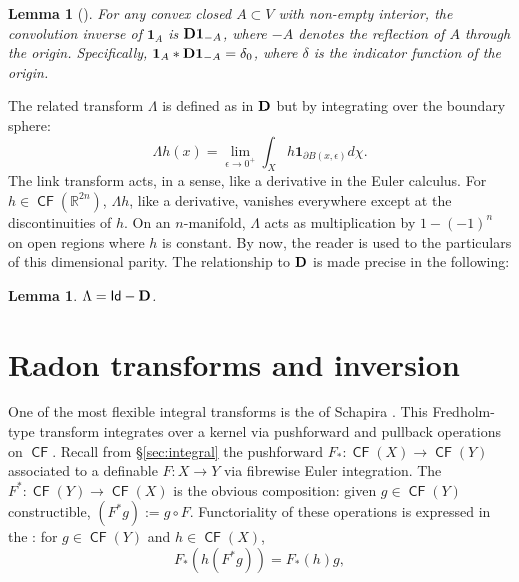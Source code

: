 \documentclass{psapm-l}
\newtheorem{lemma}[theorem]{Lemma}
\theoremstyle{definition}
\theoremstyle{remark}
\numberwithin{equation}{section}
\begin{document}
\begin{lemma}[\cite{Schapira:tom}]
\label{lem:deconv}
For any convex closed $A\subset V$ with non-empty interior, the convolution inverse of ${{\mathbf{1}}}_A$ is ${{\bf D}}{{\mathbf{1}}}_{-A}$, where $-A$ denotes the reflection of $A$ through the origin. Specifically, ${{\mathbf{1}}}_A*{{\bf D}}{{\mathbf{1}}}_{-A}=\delta_0$, where $\delta$ is the indicator function of the origin.
\end{lemma}

The related {{}} transform ${{\Lambda}}$ is defined as in ${{\bf D}}$ but by integrating over the boundary sphere:
\begin{equation}
    {{\Lambda}} h(x)
    =
    \lim_{\epsilon\to 0^+}\int_X h{{\mathbf{1}}}_{{\partial} B(x,\epsilon)}d\chi.
\end{equation}
The link transform acts, in a sense, like a derivative in the Euler calculus. For $h\in{{{\operatorname{\mathsf{{CF}}}}}}({{\mathbb R}}^{2n})$, ${{\Lambda}} h$, like a derivative, vanishes everywhere except at the discontinuities of $h$. On an $n$-manifold, ${{\Lambda}}$ acts as multiplication by $1-(-1)^n$ on open regions where $h$ is constant. By now, the reader is used to the particulars of this dimensional parity. The relationship to ${{\bf D}}$ is made precise in the following:
\begin{lemma}
${{\Lambda}}={{{\operatorname{\mathsf{{Id}}}}}}-{{\bf D}}$.
\end{lemma}

\section{Radon transforms and inversion}
\label{sec:radon}

One of the most flexible integral transforms is the {{}} of Schapira \cite{Schapira:tom,Brocker,CE}. This Fredholm-type transform integrates over a kernel via pushforward and pullback operations on ${{{\operatorname{\mathsf{{CF}}}}}}$. Recall from \S\ref{sec:integral} the pushforward $F_*\colon{{{\operatorname{\mathsf{{CF}}}}}}(X)\to{{{\operatorname{\mathsf{{CF}}}}}}(Y)$ associated to a definable $F\colon X\to Y$ via fibrewise Euler integration. The {{}} $F^*\colon{{{\operatorname{\mathsf{{CF}}}}}}(Y)\to{{{\operatorname{\mathsf{{CF}}}}}}(X)$ is the obvious composition: given $g\in{{{\operatorname{\mathsf{{CF}}}}}}(Y)$ constructible, $(F^*g) := g\circ F$. Functoriality of these operations is expressed in the {{}}: for $g\in{{{\operatorname{\mathsf{{CF}}}}}}(Y)$ and $h\in{{{\operatorname{\mathsf{{CF}}}}}}(X)$,
\begin{equation}
\label{eq:proj}
           F_*(h(F^*g)) = F_*(h)g ,
\end{equation}
\end{document}
